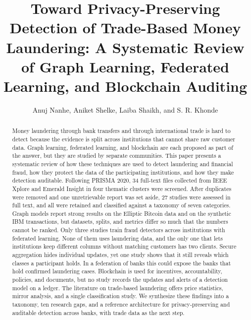 \documentclass[journal]{IEEEtran}
\begin{document}
\title{Toward Privacy-Preserving Detection of Trade-Based Money Laundering: A Systematic Review of Graph Learning, Federated Learning, and Blockchain Auditing}

\author{Anuj Nanhe, Aniket Shelke, Laiba Shaikh, and S. R. Khonde}


\maketitle

\begin{abstract}
Money laundering through bank transfers and through international trade is hard to detect because the evidence is split across institutions that cannot share raw customer data. Graph learning, federated learning, and blockchain are each proposed as part of the answer, but they are studied by separate communities. This paper presents a systematic review of how these techniques are used to detect laundering and financial fraud, how they protect the data of the participating institutions, and how they make detection auditable. Following PRISMA 2020, 34 full-text files collected from IEEE Xplore and Emerald Insight in four thematic clusters were screened. After duplicates were removed and one unretrievable report was set aside, 27 studies were assessed in full text, and all were retained and classified against a taxonomy of seven categories. Graph models report strong results on the Elliptic Bitcoin data and on the synthetic IBM transactions, but datasets, splits, and metrics differ so much that the numbers cannot be ranked. Only three studies train fraud detectors across institutions with federated learning. None of them uses laundering data, and the only one that lets institutions keep different columns without matching customers has two clients. Secure aggregation hides individual updates, yet one study shows that it still reveals which classes a participant holds. In a federation of banks this could expose the banks that hold confirmed laundering cases. Blockchain is used for incentives, accountability, policies, and documents, but no study records the updates and alerts of a detection model on a ledger. The literature on trade-based laundering offers price statistics, mirror analysis, and a single classification study. We synthesize these findings into a taxonomy, ten research gaps, and a reference architecture for privacy-preserving and auditable detection across banks, with trade data as the next step.
\end{abstract}
\end{document}
